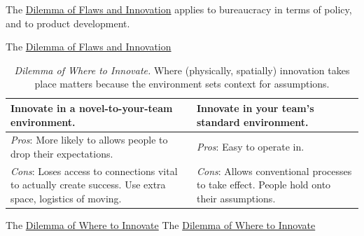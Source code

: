The \href{table:flaws-and-innovation}{Dilemma of Flaws and Innovation} applies to bureaucracy in terms of policy, and to product development.

The \href{table:flaws-and-innovation}{Dilemma of Flaws and Innovation}


\begin{center}
\begin{table}[H] %
\begin{tabular}{ | m{\dilemmatablewidth}| m{\dilemmatablewidth} | } 
  \hline
  \textbf{Innovate in a novel-to-your-team environment.} &
  \textbf{Innovate in your team's standard environment.} \\
  \hline
  \textit{Pros}: More likely to allows people to drop their expectations.  & 
  \textit{Pros}: Easy to operate in. \\
  \hline
  \textit{Cons}: Loses access to connections vital to actually create success. Use extra space, logistics of moving. & 
  \textit{Cons}: Allows conventional processes to take effect. People hold onto their assumptions. \\
  \hline
\end{tabular}
\caption{
\textit{Dilemma of Where to Innovate.}
Where (physically, spatially) innovation takes place matters because the environment sets context for assumptions.
}
\label{table:where-to-innovate}
\end{table}
\end{center}

The \href{table:where-to-innovate}{Dilemma of Where to Innovate}
The \href{table:where-to-innovate}{Dilemma of Where to Innovate}


